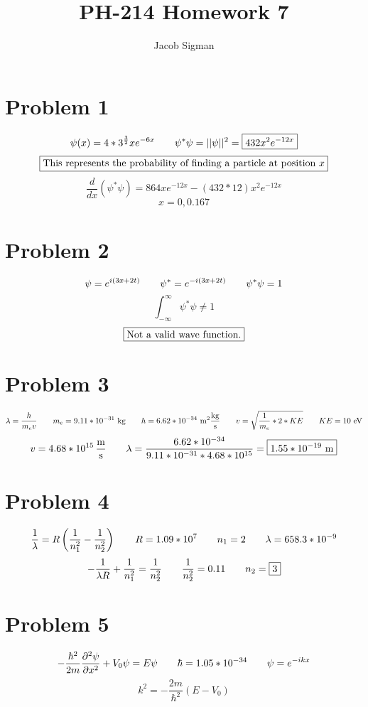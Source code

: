 \documentclass{article}
\title{PH-214 Homework 7}
\author{Jacob Sigman}
\date{}
\begin{document}
\maketitle
\section*{Problem 1}
\[\psi(x)=4*3^{\frac{3}{2}}xe^{-6x}\hspace{7 mm}\psi^{*}\psi=||\psi||^2=\boxed{432x^2e^{-12x}}\]
\[\boxed{\textnormal{This represents the probability of finding a particle at position }x}\]
\[\frac{d}{dx}(\psi^{*}\psi)=864xe^{-12x}-(432*12)x^2e^{-12x}\]
\[x=0,\boxed{0.167}\]
\section*{Problem 2}
\[\psi=e^{i(3x+2t)}\hspace{7 mm}\psi^{*}=e^{-i(3x+2t)}\hspace{7 mm}\psi^{*}\psi=1\]
\[\int_{-\infty}^{\infty}\psi^{*}\psi\neq 1\]
\[\boxed{\textnormal{Not a valid wave function.}}\]
\section*{Problem 3}
\[\lambda=\frac{h}{m_ev}\hspace{7 mm}m_e=9.11*10^{-31}\textnormal{ kg}\hspace{7 mm}h=6.62*10^{-34}\textnormal{ m}^2\frac{\textnormal{kg}}{\textnormal{s}}\hspace{7 mm}v=\sqrt{\frac{1}{m_e}*2*KE}\hspace{7 mm}KE=10\textnormal{ eV}\]
\[v=4.68*10^{15}\,\frac{\textnormal{m}}{\textnormal{s}}\hspace{7 mm}\lambda=\frac{6.62*10^{-34}}{9.11*10^{-31}*4.68*10^{15}}=\boxed{1.55*10^{-19}\textnormal{ m}}\]
\section*{Problem 4}
\[\frac{1}{\lambda}=R\left(\frac{1}{n_1^2}-\frac{1}{n_2^2}\right)\hspace{7 mm}R=1.09*10^7\hspace{7 mm}n_1=2\hspace{7 mm}\lambda=658.3*10^{-9}\]
\[-\frac{1}{\lambda R}+\frac{1}{n_1^2}=\frac{1}{n_2^2}\hspace{7 mm}\frac{1}{n_2^2}=0.11\hspace{7 mm}n_2=\boxed{3}\]
\section*{Problem 5}
\[-\frac{\hbar^2}{2m}\frac{\partial^2\psi}{\partial x^2}+V_0\psi=E\psi\hspace{7 mm}\hbar=1.05*10^{-34}\hspace{7 mm}\psi=e^{-ikx}\]
\[k^2=-\frac{2m}{\hbar^2}(E-V_0)\]
\end{document}
